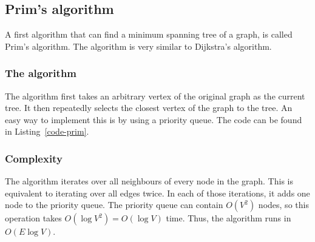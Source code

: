 \subsection{Prim's algorithm}
A first algorithm that can find a minimum spanning tree of a graph, is called Prim's algorithm. The algorithm is very similar to Dijkstra's algorithm.
\subsubsection{The algorithm}
The algorithm first takes an arbitrary vertex of the original graph as the current tree. It then repeatedly selects the closest vertex of the graph to the tree. An easy way to implement this is by using a priority queue. The code can be found in Listing~\ref{code-prim}.


\subsubsection{Complexity}
The algorithm iterates over all neighbours of every node in the graph. This is equivalent to iterating over all edges twice. In each of those iterations, it adds one node to the priority queue. The priority queue can contain $O(V^2)$ nodes, so this operation takes $O(\log{V^2}) = O(\log{V})$ time. Thus, the algorithm runs in $O(E \log{V})$.